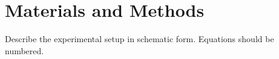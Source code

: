 
\section{Materials and Methods}
Describe the experimental setup in schematic form.  
Equations should be numbered.